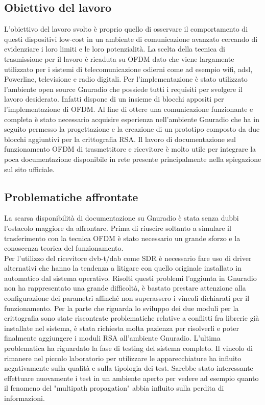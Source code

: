 \subsection{Obiettivo del lavoro} L'obiettivo del lavoro svolto è proprio quello di osservare il comportamento di questi dispositivi low-cost in un ambiente di comunicazione avanzato cercando di evidenziare i loro limiti e le loro potenzialità.
La scelta della tecnica di trasmissione per il lavoro è ricaduta su OFDM dato che viene largamente utilizzato per i sistemi di telecomunicazione odierni come ad esempio wifi, adsl, Powerline, televisione e radio digitali.
Per l'implementazione è stato utilizzato l'ambiente open source Gnuradio che possiede tutti i requisiti per svolgere il lavoro desiderato. Infatti dispone di un insieme di blocchi appositi per l'implementazione di OFDM.
Al fine di ottere una comunicazione funzionante e completa è stato necessario acquisire esperienza nell'ambiente Gnuradio che ha in seguito permesso la progettazione e la creazione di un prototipo composto da due blocchi aggiuntivi per la crittografia RSA.
Il lavoro di documentazione sul funzionamento OFDM di trasmettitore e ricevitore è molto utile per integrare la poca documentazione disponibile in rete presente principalmente nella spiegazione sul sito ufficiale.
\subsection{Problematiche affrontate}
La scarsa disponibilità di documentazione su Gnuradio è stata senza dubbi l'ostacolo maggiore da affrontare. Prima di riuscire soltanto a simulare il trasferimento con la tecnica OFDM è stato necessario un grande sforzo e la conoscenza teorica del funzionamento.\\ Per l'utilizzo del ricevitore dvb-t/dab come SDR è necessario fare uso di driver alternativi che hanno la tendenza a litigare con quello originale installato in automatico dal sistema operativo. Risolti questi problemi l'aggiunta in Gnuradio non ha rappresentato una grande difficoltà, è bastato prestare attenzione alla configurazione dei parametri affinché non superassero i vincoli dichiarati per il funzionamento.
Per la parte che riguarda lo sviluppo dei due moduli per la crittografia sono state riscontrate problematiche relative a conflitti fra librerie già installate nel sistema, è stata richiesta molta pazienza per risolverli e poter finalmente aggiungere i moduli RSA all'ambiente Gnuradio.
L'ultima problematica ha riguardato la fase di testing del sistema completo. Il vincolo di rimanere nel piccolo laboratorio per utilizzare le apparecchiature ha influito negativamente sulla qualità e sulla tipologia dei test. Sarebbe stato interessante effettuare nuovamente i test in un ambiente aperto per vedere ad esempio quanto il fenomeno del "multipath propagation" abbia influito sulla perdita di informazioni.
